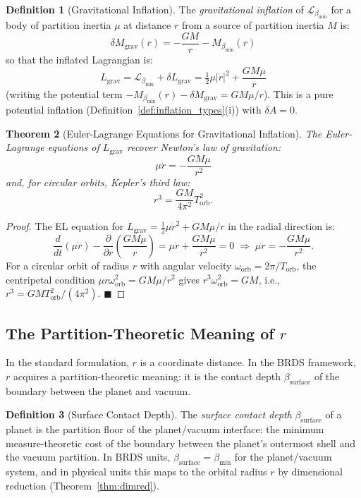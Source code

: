 \documentclass[11pt,twocolumn,a4paper]{article}
\theoremstyle{plain}
\newtheorem{theorem}{Theorem}[section]
\theoremstyle{definition}
\newtheorem{definition}[theorem]{Definition}
\theoremstyle{remark}
\newcommand{\bmin}{\beta_{\min}}
\newcommand{\Lmin}{\mathcal{L}_{\bmin}}
\newcommand{\half}{\tfrac{1}{2}}
\renewcommand{\qed}{\hfill$\blacksquare$}
\begin{document}
\begin{definition}[Gravitational Inflation]
\label{def:grav_inflation}
The \emph{gravitational inflation} of $\Lmin$ for a body of partition inertia
$\mu$ at distance $r$ from a source of partition inertia $M$ is:
\[
  \delta M_{\mathrm{grav}}(r) = -\frac{GM}{r} - M_{\bmin}(r)
\]
so that the inflated Lagrangian is:
\[
  L_{\mathrm{grav}} = \Lmin + \delta L_{\mathrm{grav}}
  = \half\mu|\dot{r}|^2 + \frac{GM\mu}{r}
\]
(writing the potential term $-M_{\bmin}(r) - \delta M_{\mathrm{grav}} = GM\mu/r$).
This is a pure potential inflation (Definition~\ref{def:inflation_types}(i))
with $\delta A = 0$.
\end{definition}

\begin{theorem}[Euler-Lagrange Equations for Gravitational Inflation]
\label{thm:newtongrav}
The Euler-Lagrange equations of $L_{\mathrm{grav}}$ recover Newton's law of
gravitation:
\[
  \mu\ddot{r} = -\frac{GM\mu}{r^2}
\]
and, for circular orbits, Kepler's third law:
\[
  r^3 = \frac{GM}{4\pi^2}T_{\mathrm{orb}}^2.
\]
\end{theorem}

\begin{proof}
The EL equation for $L_{\mathrm{grav}} = \half\mu\dot{r}^2 + GM\mu/r$ in the
radial direction is:
\[
  \frac{d}{dt}(\mu\dot{r}) - \frac{\partial}{\partial r}\!\left(\frac{GM\mu}{r}\right)
  = \mu\ddot{r} + \frac{GM\mu}{r^2} = 0
  \;\Longrightarrow\; \mu\ddot{r} = -\frac{GM\mu}{r^2}.
\]
For a circular orbit of radius $r$ with angular velocity $\omega_{\mathrm{orb}} =
2\pi/T_{\mathrm{orb}}$, the centripetal condition $\mu r\omega_{\mathrm{orb}}^2 =
GM\mu/r^2$ gives $r^3\omega_{\mathrm{orb}}^2 = GM$, i.e.,
$r^3 = GM T_{\mathrm{orb}}^2/(4\pi^2)$. \qed
\end{proof}

\subsection{The Partition-Theoretic Meaning of $r$}

In the standard formulation, $r$ is a coordinate distance. In the BRDS framework,
$r$ acquires a partition-theoretic meaning: it is the contact depth
$\beta_{\mathrm{surface}}$ of the boundary between the planet and vacuum.

\begin{definition}[Surface Contact Depth]
\label{def:surfacedepth}
The \emph{surface contact depth} $\beta_{\mathrm{surface}}$ of a planet is the
partition floor of the planet/vacuum interface: the minimum measure-theoretic
cost of the boundary between the planet's outermost shell and the vacuum partition.
In BRDS units, $\beta_{\mathrm{surface}} = \bmin$ for the planet/vacuum system,
and in physical units this maps to the orbital radius $r$ by dimensional
reduction (Theorem~\ref{thm:dimred}).
\end{definition}
\end{document}
